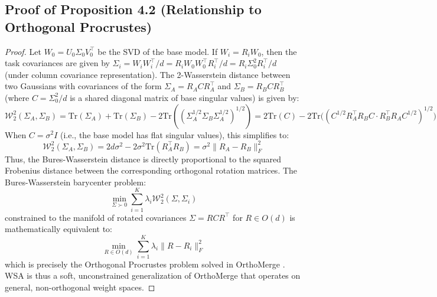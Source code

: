\documentclass{article}
\theoremstyle{plain}
\theoremstyle{definition}
\theoremstyle{remark}
\begin{document}
\subsection{Proof of Proposition 4.2 (Relationship to Orthogonal Procrustes)}
\label{appendix:proof-procrustes}
\begin{proof}
Let $W_0 = U_0 \Sigma_0 V_0^\top$ be the SVD of the base model. If $W_i = R_i W_0$, then the task covariances are given by $\Sigma_i = W_i W_i^\top / d = R_i W_0 W_0^\top R_i^\top / d = R_i \Sigma_0^2 R_i^\top / d$ (under column covariance representation). 
The 2-Wasserstein distance between two Gaussians with covariances of the form $\Sigma_A = R_A C R_A^\top$ and $\Sigma_B = R_B C R_B^\top$ (where $C = \Sigma_0^2/d$ is a shared diagonal matrix of base singular values) is given by:
\begin{equation}
  \mathcal{W}_2^2(\Sigma_A, \Sigma_B) = \text{Tr}(\Sigma_A) + \text{Tr}(\Sigma_B) - 2\text{Tr}\left( (\Sigma_A^{1/2} \Sigma_B \Sigma_A^{1/2})^{1/2} \right) = 2\text{Tr}(C) - 2\text{Tr}\Big( (C^{1/2} R_A^\top R_B C \cdot R_B^\top R_A C^{1/2})^{1/2} \Big)
\end{equation}
When $C = \sigma^2 I$ (i.e., the base model has flat singular values), this simplifies to:
\begin{equation}
  \mathcal{W}_2^2(\Sigma_A, \Sigma_B) = 2d\sigma^2 - 2\sigma^2 \text{Tr}(R_A^\top R_B) = \sigma^2 \|R_A - R_B\|_F^2
\end{equation}
Thus, the Bures-Wasserstein distance is directly proportional to the squared Frobenius distance between the corresponding orthogonal rotation matrices. The Bures-Wasserstein barycenter problem:
\begin{equation}
  \min_{\Sigma \succ 0} \sum_{i=1}^K \lambda_i \mathcal{W}_2^2(\Sigma, \Sigma_i)
\end{equation}
constrained to the manifold of rotated covariances $\Sigma = R C R^\top$ for $R \in O(d)$ is mathematically equivalent to:
\begin{equation}
  \min_{R \in O(d)} \sum_{i=1}^K \lambda_i \|R - R_i\|_F^2
\end{equation}
which is precisely the Orthogonal Procrustes problem solved in OrthoMerge \cite{orthomerge}. WSA is thus a soft, unconstrained generalization of OrthoMerge that operates on general, non-orthogonal weight spaces.
\end{proof}
\end{document}
